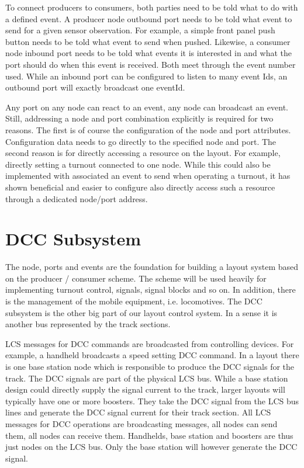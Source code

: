 To connect producers to consumers, both parties need to be told what to do with a defined event. A producer node outbound port needs to be told what event to send for a given sensor observation. For example, a simple front panel push button needs to be told what event to send when pushed. Likewise, a consumer node inbound port needs to be told what events it is interested in and what the port should do when this event is received. Both meet through the event number used. While an inbound port can be configured to listen to many event Ids, an outbound port will exactly broadcast one eventId.

Any port on any node can react to an event, any node can broadcast an event. Still, addressing a node and port combination explicitly is required for two reasons. The first is of course the configuration of the node and port attributes. Configuration data needs to go directly to the specified node and port. The second reason is for directly accessing a resource on the layout. For example, directly setting a turnout connected to one node. While this could also be implemented with associated an event to send when operating a turnout, it has shown beneficial and easier to configure also directly access such a resource through a dedicated node/port address.

\section{DCC Subsystem}

The node, ports and events are the foundation for building a layout system based on the producer / consumer scheme. The scheme will be used heavily for implementing turnout control, signals, signal blocks and so on. In addition, there is the management of the mobile equipment, i.e. locomotives. The DCC subsystem is the other big part of our layout control system. In a sense it is another bus represented by the track sections.

LCS messages for DCC commands are broadcasted from controlling devices. For example, a handheld broadcasts a speed setting DCC command. In a layout there is one base station node which is responsible to produce the DCC signals for the track. The DCC signals are part of the physical LCS bus. While a base station design could directly supply the signal current to the track, larger layouts will typically have one or more boosters. They take the DCC signal from the LCS bus lines and generate the DCC signal current for their track section. All LCS messages for DCC operations are broadcasting messages, all nodes can send them, all nodes can receive them. Handhelds, base station and boosters are thus just nodes on the LCS bus. Only the base station will however generate the DCC signal.

